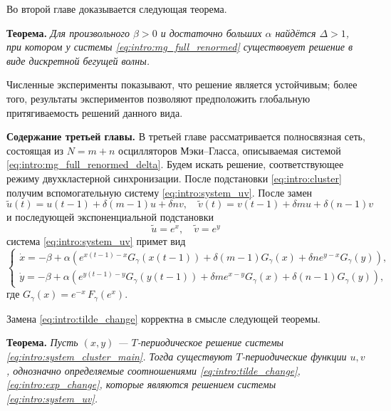 Во второй главе доказывается следующая теорема.

\textbf{Теорема.} \textit{Для произвольного $\beta > 0$ и достаточно больших $\alpha$ найдётся $\Delta > 1$, при котором у системы \eqref{eq:intro:mg_full_renormed} существовует решение в виде дискретной бегущей волны.}
	
Численные эксперименты показывают, что решение является устойчивым; более того, результаты экспериментов позволяют предположить глобальную притягиваемость решений данного вида.

\bigskip

\textbf{Содержание третьей главы.} В третьей главе рассматривается полносвязная сеть, состоящая из $N = m + n$ осцилляторов Мэки--Гласса, описываемая системой \eqref{eq:intro:mg_full_renormed_delta}. Будем искать решение, соответствующее режиму двухкластерной синхронизации. После подстановки \eqref{eq:intro:cluster} получим вспомогательную систему \eqref{eq:intro:system_uv}. После замен
%
\begin{equation}
	\label{eq:intro:tilde_change}
	\tilde{u}(t) = u(t - 1) + \delta (m - 1) u + \delta n v, \quad \tilde{v}(t) = v(t - 1) + \delta m u + \delta (n - 1) v
\end{equation}
%
и последующей экспоненциальной подстановки
\begin{equation}
	\label{eq:intro:exp_change}
	\tilde{u} = e^x, \quad \tilde{v} = e^y
\end{equation}
%
система \eqref{eq:intro:system_uv} примет вид
%
\begin{equation}
	\label{eq:intro:system_cluster_main}
	\begin{cases}
		\dot{x} = -\beta + \alpha \left(e^{x(t - 1) - x} G_{\gamma} (x(t - 1)) + \delta (m - 1) G_{\gamma} (x) + \delta n e^{y - x} G_{\gamma} (y)\right),\\
		\dot{y} = -\beta + \alpha \left(e^{y(t - 1) - y} G_{\gamma} (y(t - 1)) + \delta m e^{x - y} G_{\gamma} (x) + \delta (n - 1) G_{\gamma} (y)\right),
	\end{cases}
\end{equation}
где $G_{\gamma} (x) = e^{-x} \, F_{\gamma} (e^x)$.

Замена \eqref{eq:intro:tilde_change} корректна в смысле следующей теоремы.

\textbf{Теорема.} \textit{Пусть $(x, y)$ --- $T$-периодическое решение системы \eqref{eq:intro:system_cluster_main}. Тогда существуют $T$-периодические функции $u, v$, однозначно определяемые соотношениями \eqref{eq:intro:tilde_change}, \eqref{eq:intro:exp_change}, которые являются решением системы \eqref{eq:intro:system_uv}.}

